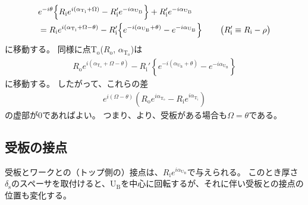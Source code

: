 \begin{align}
  \notag
  & e^{-i\theta}\!
    \left\{R_\mathrm ie^{i(\alpha_{\mathrm T_\mathrm i}+\Omega)}
           -R_\mathrm i'e^{-i\alpha_{\mathrm U_\mathrm B}}\right\}
    +R_\mathrm i'e^{-i\alpha_{\mathrm U_\mathrm B}}\\
  & = R_\mathrm ie^{i(\alpha_{\mathrm T_\mathrm i}+\Omega-\theta)}
      -R_\mathrm i'\!
       \left\{e^{-i(\alpha_{\mathrm U_\mathrm B}+\theta)}-e^{-i\alpha_{\mathrm U_\mathrm B}}\right\}\qquad
    \big(R_\mathrm i' \equiv R_\mathrm i-\rho\big)
    \label{eq:afterftUfinite}
\end{align}
に移動する。
同様に点T$_\mathrm o$($R_\mathrm o$, $\alpha_{\mathrm T_\mathrm o}$)は
\begin{align*}
  R_\mathrm oe^{i(\alpha_{\mathrm T_\mathrm o}+\Omega-\theta)}
  -R_\mathrm i'\!
   \left\{e^{-i(\alpha_{\mathrm U_\mathrm B} + \theta)} - e^{-i\alpha_{\mathrm U_\mathrm B}}\right\}
\end{align*}
に移動する。
したがって、これらの差
\begin{align*}
  e^{i(\Omega-\theta)}
  \left(R_\mathrm oe^{i\alpha_{\mathrm T_\mathrm o}} - R_\mathrm ie^{i\alpha_{\mathrm T_\mathrm i}}\right)
\end{align*}
の虚部が0であればよい。
つまり、より、受板がある場合も$\Omega = \theta$である。


\subsection{受板の接点}
受板とワークとの（トップ側の）接点は、$R_\mathrm ie^{i\alpha_{\mathrm U_\mathrm B}}$で与えられる。
このとき厚さ$\delta_\mathrm s$のスペーサを取付けると、U$_\mathrm B$を中心に回転するが、それに伴い受板との接点の位置も変化する。

